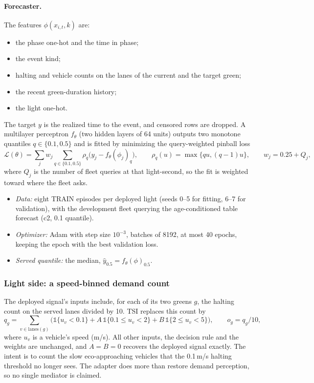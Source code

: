 \documentclass[11pt]{article}
\begin{document}
\paragraph{Forecaster.} The features $\phi(x_{i,t},k)$ are:
\begin{itemize}\setlength\itemsep{0pt}
\item the phase one-hot and the time in phase;
\item the event kind;
\item halting and vehicle counts on the lanes of the current and the target green;
\item the recent green-duration history;
\item the light one-hot.
\end{itemize}
The target $y$ is the realized time to the event, and censored rows are dropped. A multilayer perceptron $f_\theta$ (two hidden layers of
64 units) outputs two monotone quantiles $q\in\{0.1,0.5\}$ and is fitted by minimizing the query-weighted pinball loss
\begin{equation}
\mathcal L(\theta)=\sum_j w_j\sum_{q\in\{0.1,0.5\}}\rho_q\big(y_j-f_\theta(\phi_j)_q\big),\qquad \rho_q(u)=\max\{qu,(q-1)u\},\qquad w_j=0.25+Q_j,
\end{equation}
where $Q_j$ is the number of fleet queries at that light-second, so the fit is weighted toward where the fleet asks.
\begin{itemize}\setlength\itemsep{0pt}
\item \emph{Data:} eight TRAIN episodes per deployed light (seeds 0--5 for fitting, 6--7 for validation), with the development fleet
querying the age-conditioned table forecast (c2, 0.1 quantile).
\item \emph{Optimizer:} Adam with step size $10^{-3}$, batches of 8192, at most 40 epochs, keeping the epoch with the best validation loss.
\item \emph{Served quantile:} the median, $\hat y_{0.5}=f_\theta(\phi)_{0.5}$.
\end{itemize}
\subsubsection{Light side: a speed-binned demand count}
The deployed signal's inputs include, for each of its two greens $g$, the halting count on the served lanes divided by 10. TSI replaces this
count by
\begin{equation}
q_g=\sum_{v\in\mathrm{lanes}(g)}\Big(\mathbb 1\{u_v<0.1\}+A\,\mathbb 1\{0.1\le u_v<2\}+B\,\mathbb 1\{2\le u_v<5\}\Big),\qquad o_g=q_g/10,
\end{equation}
where $u_v$ is a vehicle's speed (m/s). All other inputs, the decision rule and the weights are unchanged, and $A=B=0$ recovers the deployed
signal exactly. The intent is to count the slow eco-approaching vehicles that the 0.1\,m/s halting threshold no longer sees. The adapter
does more than restore demand perception, so no single mediator is claimed.
\end{document}
